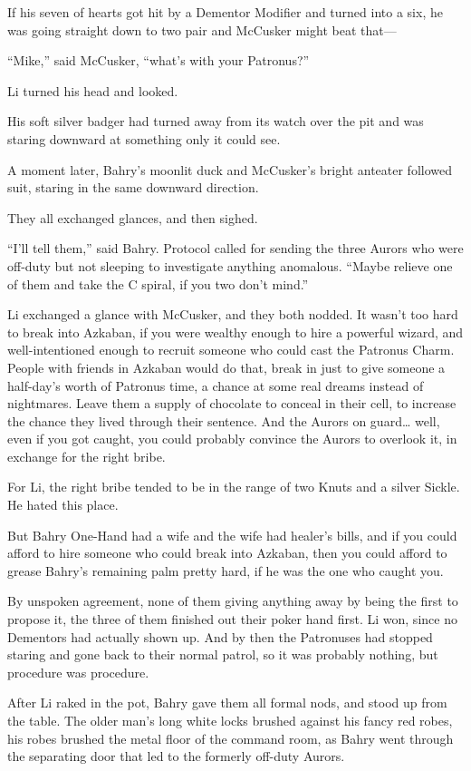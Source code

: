 If his seven of hearts got hit by a Dementor Modifier and turned into a
six, he was going straight down to two pair and McCusker might beat
that---

``Mike,'' said McCusker, ``what's with your Patronus?''

Li turned his head and looked.

His soft silver badger had turned away from its watch over the pit and
was staring downward at something only it could see.

A moment later, Bahry's moonlit duck and McCusker's bright anteater
followed suit, staring in the same downward direction.

They all exchanged glances, and then sighed.

``I'll tell them,'' said Bahry. Protocol called for sending the three
Aurors who were off-duty but not sleeping to investigate anything
anomalous. ``Maybe relieve one of them and take the C spiral, if you two
don't mind.''

Li exchanged a glance with McCusker, and they both nodded. It wasn't too
hard to break into Azkaban, if you were wealthy enough to hire a
powerful wizard, and well-intentioned enough to recruit someone who
could cast the Patronus Charm. People with friends in Azkaban would do
that, break in just to give someone a half-day's worth of Patronus time,
a chance at some real dreams instead of nightmares. Leave them a supply
of chocolate to conceal in their cell, to increase the chance they lived
through their sentence. And the Aurors on guard\ldots{} well, even if
you got caught, you could probably convince the Aurors to overlook it,
in exchange for the right bribe.

For Li, the right bribe tended to be in the range of two Knuts and a
silver Sickle. He hated this place.

But Bahry One-Hand had a wife and the wife had healer's bills, and if
you could afford to hire someone who could break into Azkaban, then you
could afford to grease Bahry's remaining palm pretty hard, if he was the
one who caught you.

By unspoken agreement, none of them giving anything away by being the
first to propose it, the three of them finished out their poker hand
first. Li won, since no Dementors had actually shown up. And by then the
Patronuses had stopped staring and gone back to their normal patrol, so
it was probably nothing, but procedure was procedure.

After Li raked in the pot, Bahry gave them all formal nods, and stood up
from the table. The older man's long white locks brushed against his
fancy red robes, his robes brushed the metal floor of the command room,
as Bahry went through the separating door that led to the formerly
off-duty Aurors.

